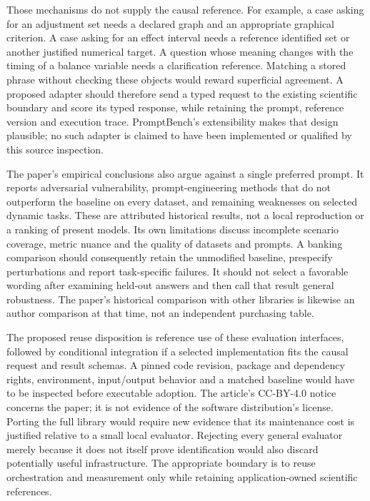 Those mechanisms do not supply the causal reference. For example, a case
asking for an adjustment set needs a declared graph and an appropriate
graphical criterion. A case asking for an effect interval needs a reference
identified set or another justified numerical target. A question whose
meaning changes with the timing of a balance variable needs a clarification
reference. Matching a stored phrase without checking these objects would
reward superficial agreement. A proposed adapter should therefore send a
typed request to the existing scientific boundary and score its typed
response, while retaining the prompt, reference version and execution
trace. PromptBench's extensibility makes that design plausible; no such
adapter is claimed to have been implemented or qualified by this source
inspection. \citep{exec18_framework_promptbench}

The paper's empirical conclusions also argue against a single preferred
prompt. It reports adversarial vulnerability, prompt-engineering methods
that do not outperform the baseline on every dataset, and remaining
weaknesses on selected dynamic tasks. These are attributed historical
results, not a local reproduction or a ranking of present models. Its own
limitations discuss incomplete scenario coverage, metric nuance and the
quality of datasets and prompts. A banking comparison should consequently
retain the unmodified baseline, prespecify perturbations and report
task-specific failures. It should not select a favorable wording after
examining held-out answers and then call that result general robustness.
The paper's historical comparison with other libraries is likewise an
author comparison at that time, not an independent purchasing table.
\citep{exec18_framework_promptbench}

The proposed reuse disposition is reference use of these evaluation
interfaces, followed by conditional integration if a selected implementation
fits the causal request and result schemas. A pinned code revision, package
and dependency rights, environment, input/output behavior and a matched
baseline would have to be inspected before executable adoption. The
article's CC-BY-4.0 notice concerns the paper; it is not evidence of the
software distribution's license. Porting the full library would require
new evidence that its maintenance cost is justified relative to a small
local evaluator. Rejecting every general evaluator merely because it does
not itself prove identification would also discard potentially useful
infrastructure. The appropriate boundary is to reuse orchestration and
measurement only while retaining application-owned scientific references.

